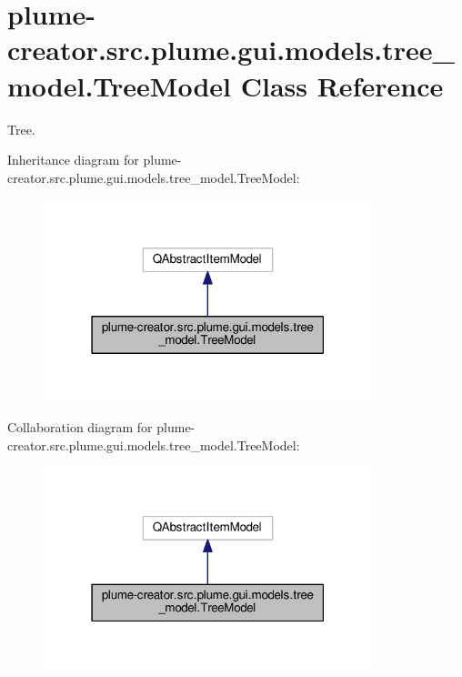 \hypertarget{classplume-creator_1_1src_1_1plume_1_1gui_1_1models_1_1tree__model_1_1_tree_model}{}\section{plume-\/creator.src.\+plume.\+gui.\+models.\+tree\+\_\+model.\+Tree\+Model Class Reference}
\label{classplume-creator_1_1src_1_1plume_1_1gui_1_1models_1_1tree__model_1_1_tree_model}


Tree.  




Inheritance diagram for plume-\/creator.src.\+plume.\+gui.\+models.\+tree\+\_\+model.\+Tree\+Model\+:\nopagebreak
\begin{figure}[H]
\begin{center}
\leavevmode
\includegraphics[width=271pt]{classplume-creator_1_1src_1_1plume_1_1gui_1_1models_1_1tree__model_1_1_tree_model__inherit__graph}
\end{center}
\end{figure}


Collaboration diagram for plume-\/creator.src.\+plume.\+gui.\+models.\+tree\+\_\+model.\+Tree\+Model\+:\nopagebreak
\begin{figure}[H]
\begin{center}
\leavevmode
\includegraphics[width=271pt]{classplume-creator_1_1src_1_1plume_1_1gui_1_1models_1_1tree__model_1_1_tree_model__coll__graph}
\end{center}
\end{figure}
